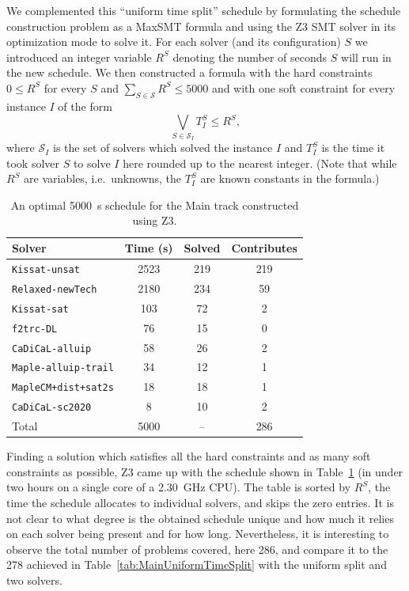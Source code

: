 \documentclass{elsarticle}
\newcommand{\solver}[1]{\texttt{#1}}
\begin{document}
We complemented this ``uniform time split'' schedule by formulating the schedule construction
problem as a MaxSMT formula and using the Z3 SMT solver \cite{DBLP:conf/tacas/MouraB08} in its optimization mode \cite{DBLP:conf/sycss/BjornerP14} to solve it.
For each solver (and its configuration) $S$ we introduced an integer variable $R^S$ denoting 
the number of seconds $S$ will run in the new schedule. We then constructed a formula with the hard
constraints $0 \leq R^S$ for every $S$ and $\sum_{S\in\mathcal{S}} R^S \leq 5000$ and with one 
soft constraint for every instance $I$ of the form
\[\bigvee_{S \in \mathcal{S}_I} T^S_I \leq R^S,\]
where $\mathcal{S}_I$ is the set of solvers which solved the instance $I$ and $T^S_I$ is the time it took solver $S$ to solve $I$ here rounded up to the nearest integer.
(Note that while $R^S$ are variables, i.e.~unknowns, the $T^S_I$ are known constants in the formula.)

\begin{table}
\centering\small
\begin{tabularx}{\linewidth}{Xccc}
\bf Solver & \bf Time (s) & \bf Solved & \bf Contributes \\
\hline\arrayrulecolor{lightgray}
\solver{Kissat-unsat} & 2523 & 219 & 219 \\
\solver{Relaxed-newTech} & 2180 & 234 & \phantom{0}59 \\
\solver{Kissat-sat} & \phantom{0}103 & \phantom{0}72 & \phantom{00}2 \\
\solver{f2trc-DL} & \phantom{00}76 & \phantom{0}15 & \phantom{00}0 \\
\solver{CaDiCaL-alluip} & \phantom{00}58 & \phantom{0}26 & \phantom{00}2 \\
\solver{Maple-alluip-trail} & \phantom{00}34 & \phantom{0}12 & \phantom{00}1 \\
\solver{MapleCM+dist+sat2s} & \phantom{00}18 & \phantom{0}18 & \phantom{00}1 \\
\solver{CaDiCaL-sc2020} & \phantom{000}8 & \phantom{0}10 & \phantom{00}2 \\
\hline 
Total & 5000 & \phantom{0}-- & 286 \\ 
\end{tabularx}
\caption{An optimal \SI{5000}{\second} schedule for the Main track
constructed using Z3.}
\label{tab:MainZ3Schedule}
\end{table}

Finding a solution which satisfies all the hard constraints and as many soft constraints as possible,
Z3 came up with the schedule shown in Table~\ref{tab:MainZ3Schedule} (in under two hours on a single core of a \SI{2.30}{\giga\hertz} CPU).
The table is sorted by $R^S$, the time the schedule allocates to individual solvers, and skips the zero entries.
It is not clear to what degree is the obtained schedule unique and how much it relies on each solver being present and for how long.
Nevertheless, it is interesting to observe the total number of problems covered, here 286,
and compare it to the 278 achieved in Table~\ref{tab:MainUniformTimeSplit} with the uniform split and two solvers.
\end{document}

